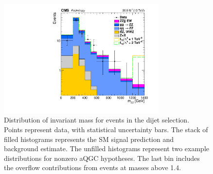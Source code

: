 \begin{figure}[htbp]
  \begin{center}
    \includegraphics[width=0.75\textwidth]{results/zzMass_aQGC.pdf}
    \caption[{\ZZ} invariant mass distribution for dijet events, with example aQGC working points]{
        Distribution of {\ZZ} invariant mass for events in the dijet selection.
        Points represent data, with statistical uncertainty bars.
        The stack of filled histograms represents the SM signal prediction and background estimate.
        The unfilled histograms represent two example {\MGAMC} distributions for nonzero aQGC hypotheses.
        The last bin includes the overflow contributions from events at masses above {1.4\TeV}.
      }\label{fig:aQGC}
  \end{center}
\end{figure}
